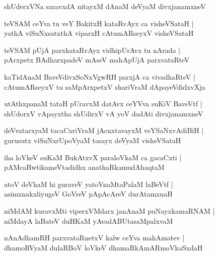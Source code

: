 \documentclass[twoside,12pt,openright]{book}
\newcounter{shloka}[chapter]
\begin{document}
\begin{shloka}%
shUderxVNa saravxdA nitayxM dAnaM deVyaM divxjanamxneV 
\end{shloka}

\begin{shloka}%
teVSAM ceYva tu veY BakitxH kataRvAyx ca visheVSataH |\\
yathA viSuNxsatxthA viparxH cAtumARseyxV visheVSataH 
\end{shloka}

\begin{shloka}%
teVSAM pUjA parxkataRvAyx vidhipUrAvx tu nArada |\\
pArxpetx BAdharxpadeV mAseV mahApUjA parxvataRteV 
\end{shloka}

\begin{shloka}%
kaTidAnaM BaveVdivxSoNxVgwRH parxjA ca vivadhaRteV |\\
cAtumARseyxV tu saMpArxpetxV shariVraM dApayeVdidxvXja
\end{shloka}

\begin{shloka}%
utAthxpanaM tataH pUravxM datAvx ceYVva suKiV BaveVtf |\\
shUdorxV vApayxtha shUdirxV vA yoV dadAti divxjanamxneV 
\end{shloka}

\begin{shloka}%
deVvatarxyaM tacaCxriVraM jAcnxtavayxM veYSaNxvAdiBiH |\\
gurusutx viSuNxrUpoVyaM tasayx deVyaM visheVSataH 
\end{shloka}

\begin{shloka}%
iha loVkeV suKaM BukAtxvX paraloVkaM ca gacaCxti |\\
pAMcaBwtikameVtadidhx anathaRkamudAhaqtaM 
\end{shloka}

\begin{shloka}%
atoV deVhaM hi guraveV yatoVnaMtaPalaM laBeVtf |\\
asimxnakxliyugeV GoVreV pApAcAreV durAtamxnaH 
\end{shloka}

\begin{shloka}%
niMdAM kuravxMti viperxVMdarx janAnaM puNayxkamaRNAM |\\
niMdayA laBateV duHKaM yAvadABUtasaMpalxvaM 
\end{shloka}

\begin{shloka}%
nAnAdhamRH parxvataRnetxV kalw ceYva mahAmatev |\\
dhamoRVyaM dulaRBoV loVkeV dhamaRkAmARmoVkaSxdaH 
\end{shloka}
\end{document}

